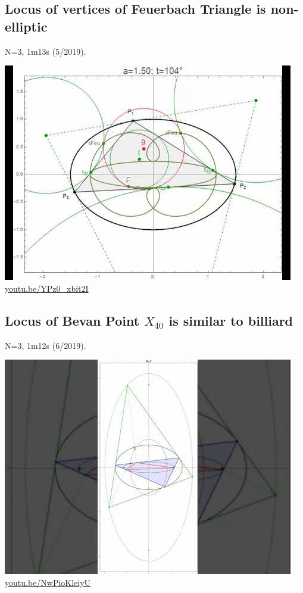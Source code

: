 \documentclass[12pt]{amsart}
\begin{document}
\subsection{Locus of vertices of Feuerbach Triangle is non-elliptic}
\label{vid:YPz0_xbit2I}
\noindent N=3, 1m13s (5/2019). 
\begin{center}\includegraphics[width=.5\textwidth]{pics/YPz0_xbit2I.jpg} \\ 
\href{https://youtu.be/YPz0_xbit2I}{\url{youtu.be/YPz0\_xbit2I}}\end{center}
% 

\subsection{Locus of Bevan Point $X_{40}$ is similar to billiard}
\label{vid:NwPioKleiyU}
\noindent N=3, 1m12s (6/2019). 
\begin{center}\includegraphics[width=.5\textwidth]{pics/NwPioKleiyU.jpg} \\ 
\href{https://youtu.be/NwPioKleiyU}{\url{youtu.be/NwPioKleiyU}}\end{center}
% 
\end{document}
